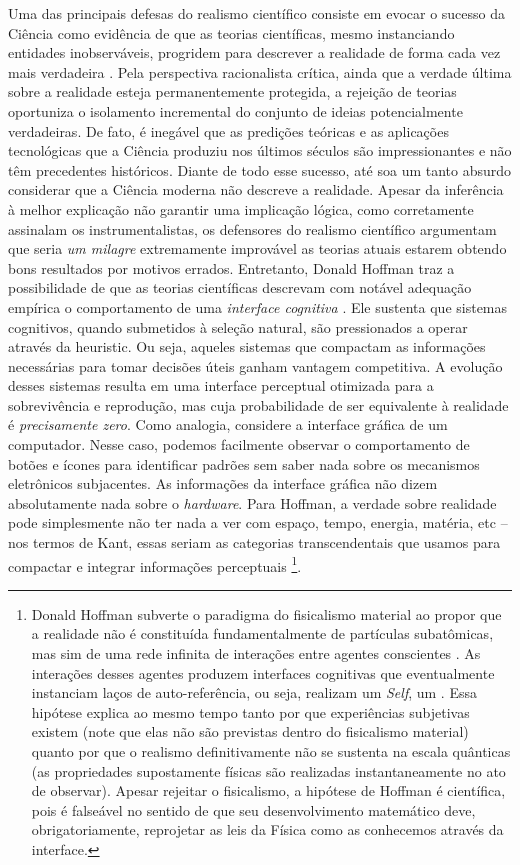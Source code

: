 \documentclass[./main.tex]{subfiles}
\begin{document}
\par Uma das principais defesas do realismo científico consiste em evocar o sucesso da Ciência como evidência de que as teorias científicas, mesmo instanciando entidades inobserváveis, progridem para descrever a realidade de forma cada vez mais verdadeira \cite{saatsi2017}. Pela perspectiva racionalista crítica, ainda que a verdade última sobre a realidade esteja permanentemente protegida, a rejeição de teorias oportuniza o isolamento incremental do conjunto de ideias potencialmente verdadeiras. De fato, é inegável que as predições teóricas e as aplicações tecnológicas que a Ciência produziu nos últimos séculos são impressionantes e não têm precedentes históricos. Diante de todo esse sucesso, até soa um tanto absurdo considerar que a Ciência moderna não descreve a realidade. Apesar da inferência à melhor explicação não garantir uma implicação lógica, como corretamente assinalam os instrumentalistas, os defensores do realismo científico argumentam que seria \textit{um milagre} extremamente improvável as teorias atuais estarem obtendo bons resultados por motivos errados. Entretanto, Donald Hoffman traz a possibilidade de que as teorias científicas descrevam com notável adequação empírica o comportamento de uma \textit{interface cognitiva} \cite{Hoffman2015}. Ele sustenta que sistemas cognitivos, quando submetidos à seleção natural, são pressionados a operar através da \gls{heuristic}. Ou seja, aqueles sistemas que compactam as informações necessárias para tomar decisões úteis ganham vantagem competitiva. A evolução desses sistemas resulta em uma interface perceptual otimizada para a sobrevivência e reprodução, mas cuja probabilidade de ser equivalente à realidade é \textit{precisamente zero}. Como analogia, considere a interface gráfica de um computador. Nesse caso, podemos facilmente observar o comportamento de botões e ícones para identificar padrões sem saber nada sobre os mecanismos eletrônicos subjacentes. As informações da interface gráfica não dizem absolutamente nada sobre o \textit{hardware}.  Para Hoffman, a verdade sobre realidade pode simplesmente não ter nada a ver com espaço, tempo, energia, matéria, etc -- nos termos de Kant, essas seriam as categorias transcendentais que usamos para compactar e integrar informações perceptuais \footnote{Donald Hoffman subverte o paradigma do fisicalismo material ao propor que a realidade não é constituída fundamentalmente de partículas subatômicas, mas sim de uma rede infinita de interações entre agentes conscientes \cite{Hoffman2023}. As interações desses agentes produzem interfaces cognitivas que eventualmente instanciam laços de auto-referência, ou seja, realizam um \textit{Self}, um . Essa hipótese explica ao mesmo tempo tanto por que experiências subjetivas existem (note que elas não são previstas dentro do fisicalismo material) quanto por que o realismo definitivamente não se sustenta na escala quânticas (as propriedades supostamente físicas são realizadas instantaneamente no ato de observar). Apesar rejeitar o fisicalismo, a hipótese de Hoffman é científica, pois é falseável no sentido de que seu desenvolvimento matemático deve, obrigatoriamente, reprojetar as leis da Física como as conhecemos através da interface.}.  
\end{document}
